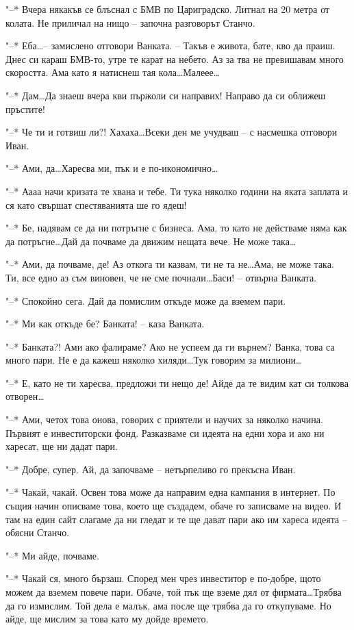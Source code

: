 \documentclass[ebook,openany,12pt]{memoir}
\begin{document}
"--* Вчера някакъв се блъснал с БМВ по Цариградско. Литнал на 20 метра от колата. Не приличал на нищо – започна разговорът Станчо.

"--* Еба\ldots – замислено отговори Ванката. – Такъв е живота, бате, кво да праиш. Днес си караш БМВ-то, утре те карат на небето. Аз за тва не превишавам много скоростта. Ама като я натиснеш тая кола\ldots Малеее\ldots

"--* Дам\ldots Да знаеш вчера кви пържоли си направих! Направо да си оближеш пръстите!

"--* Че ти и готвиш ли?! Хахаха\ldots Всеки ден ме учудваш – с насмешка отговори Иван.

"--* Ами, да\ldots Харесва ми, пък и е по-икономично\ldots

"--* Аааа начи кризата те хвана и тебе. Ти тука няколко години на яката заплата и ся като свършат спестяванията ше го ядеш!

"--* Бе, надявам се да ни потръгне с бизнеса. Ама, то като не действаме няма как да потръгне\ldots Дай да почваме да движим нещата вече. Не може така\ldots

"--* Ами, да почваме, де! Аз откога ти казвам, ти не та не\ldots Ама, не може така. Ти, все едно аз съм виновен, че не сме почнали\ldots Баси! – отвърна Ванката.

"--* Спокойно сега. Дай да помислим откъде може да вземем пари.

"--* Ми как откъде бе? Банката! – каза Ванката.

"--* Банката?! Ами ако фалираме? Ако не успеем да ги върнем? Ванка, това са много пари. Не е да кажеш няколко хиляди\ldots Тук говорим за милиони\ldots

"--* Е, като не ти харесва, предложи ти нещо де! Айде да те видим кат си толкова отворен\ldots

"--* Ами, четох това онова, говорих с приятели и научих за няколко начина. Първият е инвеститорски фонд. Разказваме си идеята на едни хора и ако ни харесат, ще ни дадат пари.

"--* Добре, супер. Ай, да започваме – нетърпеливо го прекъсна Иван.

"--* Чакай, чакай. Освен това може да направим една кампания в интернет. По същия начин описваме това, което ще създадем, обаче го записваме на видео. И там на един сайт слагаме да ни гледат и те ще дават пари ако им хареса идеята – обясни Станчо.

"--* Ми айде, почваме.

"--* Чакай ся, много бързаш. Според мен чрез инвеститор е по-добре, щото можем да вземем повече пари. Обаче, той пък ще вземе дял от фирмата\ldots Трябва да го измислим. Той дела е малък, ама после ще трябва да го откупуваме. Но айде, ще мислим за това като му дойде времето.
\end{document}
